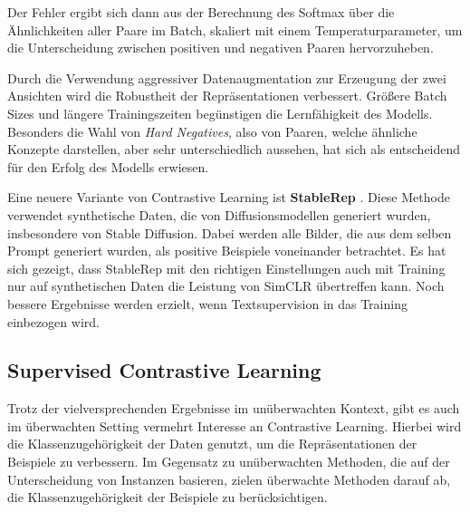 Der Fehler ergibt sich dann aus der Berechnung des Softmax über die Ähnlichkeiten aller Paare im Batch, skaliert mit einem Temperaturparameter, um die Unterscheidung zwischen positiven und negativen Paaren hervorzuheben.

Durch die Verwendung aggressiver Datenaugmentation zur Erzeugung der zwei Ansichten wird die Robustheit der Repräsentationen verbessert. Größere Batch Sizes und längere Trainingszeiten begünstigen die Lernfähigkeit des Modells. Besonders die Wahl von \textit{Hard Negatives}, also von Paaren, welche ähnliche Konzepte darstellen, aber sehr unterschiedlich aussehen, hat sich als entscheidend für den Erfolg des Modells erwiesen.

Eine neuere Variante von Contrastive Learning ist \textbf{StableRep} \parencite{Tian2023stablerep}. Diese Methode verwendet synthetische Daten, die von Diffusionsmodellen generiert wurden, insbesondere von Stable Diffusion. Dabei werden alle Bilder, die aus dem selben Prompt generiert wurden, als positive Beispiele voneinander betrachtet. Es hat sich gezeigt, dass StableRep mit den richtigen Einstellungen auch mit Training nur auf synthetischen Daten die Leistung von SimCLR übertreffen kann. Noch bessere Ergebnisse werden erzielt, wenn Textsupervision in das Training einbezogen wird.

\subsection{Supervised Contrastive Learning} \label{sec:sup-contrastive}

Trotz der vielversprechenden Ergebnisse im unüberwachten Kontext, gibt es auch im überwachten Setting vermehrt Interesse an Contrastive Learning. Hierbei wird die Klassenzugehörigkeit der Daten genutzt, um die Repräsentationen der Beispiele zu verbessern. Im Gegensatz zu unüberwachten Methoden, die auf der Unterscheidung von Instanzen basieren, zielen überwachte Methoden darauf ab, die Klassenzugehörigkeit der Beispiele zu berücksichtigen.


